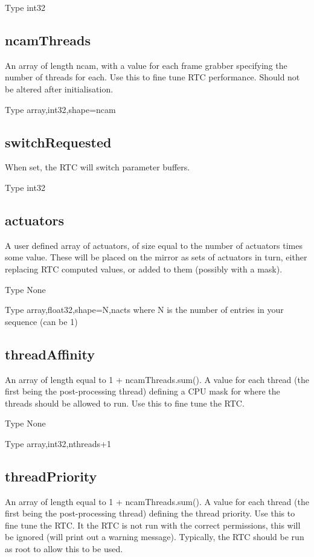 \documentclass[a4,10pt]{article}
\begin{document}
Type int32

\subsection{ncamThreads}
An array of length ncam, with a value for each frame grabber
specifying the number of threads for each.  Use this to fine tune RTC
performance.  Should not be altered after initialisation.

Type array,int32,shape=ncam

\subsection{switchRequested}
When set, the RTC will switch parameter buffers.

Type int32

\subsection{actuators}
A user defined array of actuators, of size equal to the number of
actuators times some value.  These will be placed on the mirror as
sets of actuators in turn, either replacing RTC
computed values, or added to them (possibly with a mask).

Type None

Type array,float32,shape=N,nacts where N is the number of entries in
your sequence (can be 1)


\subsection{threadAffinity}
An array of length equal to 1 + ncamThreads.sum().  A value for each
thread (the first being the post-processing thread) defining a CPU
mask for where the threads should be allowed to run.  Use this to fine
tune the RTC.

Type None

Type array,int32,nthreads+1

\subsection{threadPriority}
An array of length equal to 1 + ncamThreads.sum().  A value for each
thread (the first being the post-processing thread) defining the
thread priority.  Use this to fine tune the RTC.  It the RTC is not
run with the correct permissions, this will be ignored (will print
out a warning message).  Typically, the RTC should be run as root to
allow this to be used.
\end{document}
